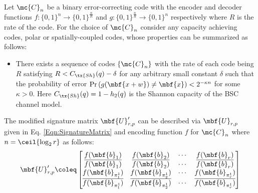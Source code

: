\documentclass[conference,twocolumn]{IEEEtran}
\begin{document}
{Let $\mc{C}_n$ be a binary error-correcting code with the encoder and decoder functions $f:\{0,1\}^{n}\rightarrow \{0,1\}^{\frac{n}{R}}$ and $g:\{0,1\}^{\frac{n}{R}}\rightarrow \{0,1\}^{n}$ respectively where $R$ is the rate of the code.
For the choice of $\mc{C}_n$ consider any capacity achieving codes, polar or spatially-coupled codes, whose properties can be summarized as follows:
\begin{itemize}
\item There exists a sequence of codes $\{\mc{C}_n\}$ with the rate of each code being $R$ satisfying $R< C_{\tx{Sh}}(q)-\delta$ for any arbitrary small constant $\delta$ such that the probability of error $\text{Pr}\left(g(\mbf{x+w})\neq \mbf{x}\right)<2^{-\kappa n}$ for some $\kappa >0$. Here $C_{\tx{Sh}}(q)=1-h_2(q)$ is the Shannon capacity of the BSC channel model.
\end{itemize}
The modified signature matrix $\mbf{U}'_{r,p}$ can be described via $\mbf{U}_{r, p}$ given in Eq. \eqref{Eqn:SignatureMatrix} and encoding function $f$ for $\mc{C}_n$ where $n=\ceil{\log_2 r}$ as follows:
 \begin{align}
\label{Eqn:SignatureMatrixModified}
\mbf{U}_{r,p}'\coleq\begin{bmatrix}
f(\mbf{b}_1)  & f(\mbf{b}_2) &\cdots & f(\mbf{b}_r) \\
\overline{f(\mbf{b}_1)} & \overline{f(\mbf{b}_2)} & \cdots & \overline{f(\mbf{b}_r)}\\
f(\mbf{b}_{\pi^{1}_{1}}) & f(\mbf{b}_{\pi^{1}_{2}}) & \cdots & f(\mbf{b}_{\pi^{1}_{r}})\\
\overline{f(\mbf{b}_{\pi^{1}_{1}})} & \overline{f(\mbf{b}_{\pi^{1}_{2}})} & \cdots & \overline{f(\mbf{b}_{\pi^{1}_{r}})}\\

\end{bmatrix}
\end{align}}
\end{document}
